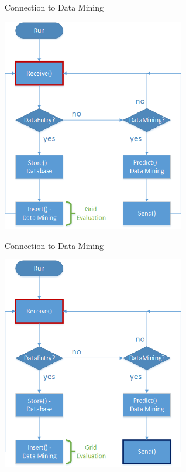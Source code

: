 	\begin{frame}{Connection to Data Mining}
		\begin{center}
	\includegraphics[height=0.64\textwidth, width=0.6\textwidth]{images/datamining_flow1.png}
	\end{center}
	\end{frame}
	
	\begin{frame}{Connection to Data Mining}
		\begin{center}
	\includegraphics[height=0.64\textwidth, width=0.6\textwidth]{images/datamining_flow2.png}
	\end{center}
	\end{frame}
